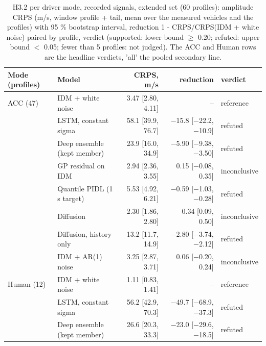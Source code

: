 \begin{table}[htbp]
\centering
\small
\caption{H3.2 per driver mode, recorded signals, extended set (60 profiles): amplitude CRPS (m/s, window profile + tail, mean over the measured vehicles and the profiles) with 95 \% bootstrap interval, reduction 1 - CRPS/CRPS(IDM + white noise) paired by profile, verdict (supported: lower bound $\geq$ 0.20; refuted: upper bound $<$ 0.05; fewer than 5 profiles: not judged). The ACC and Human rows are the headline verdicts, 'all' the pooled secondary line.}
\label{tab:t5-h32--e3--raw}
\begin{tabular}{llrrl}
\toprule
Mode (profiles) & Model & CRPS, m/s & reduction & verdict \\
\midrule
ACC (47) & IDM + white noise & 3.47 [2.80, 4.11] & -- & reference \\
 & LSTM, constant sigma & 58.1 [39.9, 76.7] & $-$15.8 [$-$22.2, $-$10.9] & refuted \\
 & Deep ensemble (kept member) & 23.9 [16.0, 34.9] & $-$5.90 [$-$9.38, $-$3.50] & refuted \\
 & GP residual on IDM & 2.94 [2.36, 3.55] & 0.15 [$-$0.08, 0.35] & inconclusive \\
 & Quantile PIDL (1 s target) & 5.53 [4.92, 6.21] & $-$0.59 [$-$1.03, $-$0.28] & refuted \\
 & Diffusion & 2.30 [1.86, 2.80] & 0.34 [0.09, 0.50] & inconclusive \\
 & Diffusion, history only & 13.2 [11.7, 14.9] & $-$2.80 [$-$3.74, $-$2.12] & refuted \\
 & IDM + AR(1) noise & 3.25 [2.87, 3.71] & 0.06 [$-$0.20, 0.24] & inconclusive \\
\midrule
Human (12) & IDM + white noise & 1.11 [0.83, 1.41] & -- & reference \\
 & LSTM, constant sigma & 56.2 [42.9, 70.3] & $-$49.7 [$-$68.9, $-$37.3] & refuted \\
 & Deep ensemble (kept member) & 26.6 [20.3, 33.3] & $-$23.0 [$-$29.6, $-$18.5] & refuted \\

\end{tabular}
\end{table}
